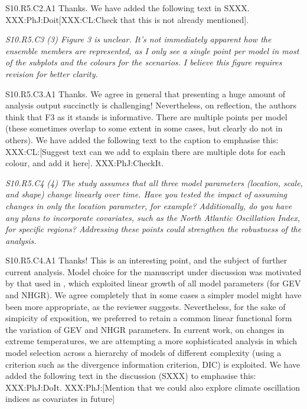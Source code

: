 \documentclass[a4paper,10pt]{article}
\begin{document}
	S10.R5.C2.A1 Thanks. We have added the following text in SXXX. XXX:PhJ:Doit[XXX:CL:Check that this is not already mentioned].

	\emph{S10.R5.C3 (3) Figure 3 is unclear. It's not immediately apparent how the ensemble members are represented, as I only see a single point per model in most of the subplots and the colours for the scenarios. I believe this figure requires revision for better clarity.}

	S10.R5.C3.A1 Thanks. We agree in general that presenting a huge amount of analysis output succinctly is challenging! Nevertheless, on reflection, the authors think that F3 as it stands is informative. There are multiple points per model (these sometimes overlap to some extent in some cases, but clearly do not in others). We have added the following text to the caption to emphasise this: XXX:CL:[Suggest text can we add to explain there are multiple dots for each colour, and add it here]. XXX:PhJ:CheckIt.

	\emph{S10.R5.C4 (4) The study assumes that all three model parameters (location, scale, and shape) change linearly over time. Have you tested the impact of assuming changes in only the location parameter, for example? Additionally, do you have any plans to incorporate covariates, such as the North Atlantic Oscillation Index, for specific regions? Addressing these points could strengthen the robustness of the analysis.}

	S10.R5.C4.A1 Thanks! This is an interesting point, and the subject of further current analysis. Model choice for the manuscript under discussion was motivated by that used in \cite{EwnJnt23a}, which exploited linear growth of all model parameters (for GEV and NHGR). We agree completely that in some cases a simpler model might have been more appropriate, as the reviewer suggests. Nevertheless, for the sake of simpicity of exposition, we preferred to retain a common linear functional form the variation of GEV and NHGR parameters. In current work, on changes in extreme temperatures, we are attempting a more sophisticated analysis in which model selection across a hierarchy of models of different complexity (using a criterion such as the divergence information criterion, DIC) is exploited. We have added the following text in the discussion (SXXX) to emphasise this: XXX:PhJ:DoIt. XXX:PhJ:[Mention that we could also explore climate oscillation indices as covariates in future]
\end{document}
